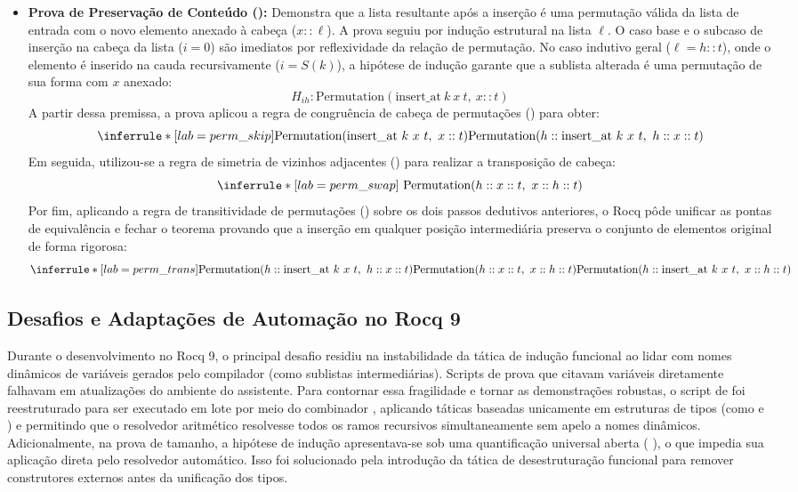 \documentclass{article}
\begin{document}
\begin{itemize}[leftmargin=*]
\item \textbf{Prova de Preservação de Conteúdo ():} Demonstra que a lista resultante após a inserção é uma permutação válida da lista de entrada com o novo elemento anexado à cabeça ($x :: \ell$).
A prova seguiu por indução estrutural na lista $\ell$. O caso base e o subcaso de inserção na cabeça da lista ($i=0$) são imediatos por reflexividade da relação de permutação. No caso indutivo geral ($\ell = h :: t$), onde o elemento é inserido na cauda recursivamente ($i = S(k)$), a hipótese de indução garante que a sublista alterada é uma permutação de sua forma com $x$ anexado:
$$H_{ih}: \text{Permutation}(\text{insert\_at} \ k \ x \ t, \ x :: t)$$
A partir dessa premissa, a prova aplicou a regra de congruência de cabeça de permutações () para obter:
$$\inferrule*[lab={perm\_skip}]{\text{Permutation}(\text{insert\_at} \ k \ x \ t, \ x :: t)}{\text{Permutation}(h :: \text{insert\_at} \ k \ x \ t, \ h :: x :: t)}$$
Em seguida, utilizou-se a regra de simetria de vizinhos adjacentes () para realizar a transposição de cabeça:
$$\inferrule*[lab={perm\_swap}]{~}{\text{Permutation}(h :: x :: t, \ x :: h :: t)}$$
Por fim, aplicando a regra de transitividade de permutações () sobre os dois passos dedutivos anteriores, o Rocq pôde unificar as pontas de equivalência e fechar o teorema provando que a inserção em qualquer posição intermediária preserva o conjunto de elementos original de forma rigorosa:
$$\inferrule*[lab={perm\_trans}]{\text{Permutation}(h :: \text{insert\_at} \ k \ x \ t, \ h :: x :: t) \\ \text{Permutation}(h :: x :: t, \ x :: h :: t)}{\text{Permutation}(h :: \text{insert\_at} \ k \ x \ t, \ x :: h :: t)}$$
\end{itemize}

\subsection{Desafios e Adaptações de Automação no Rocq 9}
Durante o desenvolvimento no Rocq 9, o principal desafio residiu na instabilidade da tática de indução funcional ao lidar com nomes dinâmicos de variáveis gerados pelo compilador (como sublistas intermediárias). Scripts de prova que citavam variáveis diretamente falhavam em atualizações do ambiente do assistente.
Para contornar essa fragilidade e tornar as demonstrações robustas, o script de  foi reestruturado para ser executado em lote por meio do combinador , aplicando táticas baseadas unicamente em estruturas de tipos (como  e ) e permitindo que o resolvedor aritmético resolvesse todos os ramos recursivos simultaneamente sem apelo a nomes dinâmicos. Adicionalmente, na prova de tamanho, a hipótese de indução apresentava-se sob uma quantificação universal aberta (  ), o que impedia sua aplicação direta pelo resolvedor automático. Isso foi solucionado pela introdução da tática de desestruturação funcional  para remover construtores externos antes da unificação dos tipos.
\end{document}
